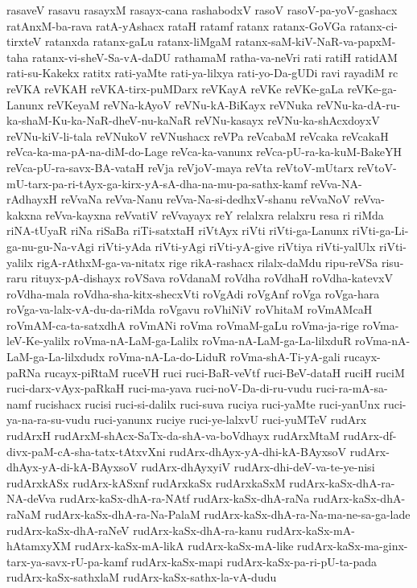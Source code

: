 {rasaveV
rasavu
rasayxM
rasayx-cana
rashabodxV
rasoV
rasoV-pa-yoV-gashacx
ratAnxM-ba-rava
ratA-yAshacx
rataH
ratamf
ratanx
ratanx-GoVGa
ratanx-ci-tirxteV
ratanxda
ratanx-gaLu
ratanx-liMgaM
ratanx-saM-kiV-NaR-va-papxM-taha
ratanx-vi-sheV-Sa-vA-daDU
rathamaM
ratha-va-neVri
rati
ratiH
ratidAM
rati-su-Kakekx
ratitx
rati-yaMte
rati-ya-lilxya
rati-yo-Da-gUDi
ravi
rayadiM
rc
reVKA
reVKAH
reVKA-tirx-puMDarx
reVKayA
reVKe
reVKe-gaLa
reVKe-ga-Lanunx
reVKeyaM
reVNa-kAyoV
reVNu-kA-BiKayx
reVNuka
reVNu-ka-dA-ru-ka-shaM-Ku-ka-NaR-dheV-nu-kaNaR
reVNu-kasayx
reVNu-ka-shAcxdoyxV
reVNu-kiV-li-tala
reVNukoV
reVNushacx
reVPa
reVcabaM
reVcaka
reVcakaH
reVca-ka-ma-pA-na-diM-do-Lage
reVca-ka-vanunx
reVca-pU-ra-ka-kuM-BakeYH
reVca-pU-ra-savx-BA-vataH
reVja
reVjoV-maya
reVta
reVtoV-mUtarx
reVtoV-mU-tarx-pa-ri-tAyx-ga-kirx-yA-sA-dha-na-mu-pa-sathx-kamf
reVva-NA-rAdhayxH
reVvaNa
reVva-Nanu
reVva-Na-si-dedhxV-shanu
reVvaNoV
reVva-kakxna
reVva-kayxna
reVvatiV
reVvayayx
reY
relalxra
relalxru
resa
ri
riMda
riNA-tUyaR
riNa
riSaBa
riTi-satxtaH
riVtAyx
riVti
riVti-ga-Lanunx
riVti-ga-Li-ga-nu-gu-Na-vAgi
riVti-yAda
riVti-yAgi
riVti-yA-give
riVtiya
riVti-yalUlx
riVti-yalilx
rigA-rAthxM-ga-va-nitatx
rige
rikA-rashacx
rilalx-daMdu
ripu-reVSa
risu-raru
rituyx-pA-dishayx
roVSava
roVdanaM
roVdha
roVdhaH
roVdha-katevxV
roVdha-mala
roVdha-sha-kitx-shecxVti
roVgAdi
roVgAnf
roVga
roVga-hara
roVga-va-lalx-vA-du-da-riMda
roVgavu
roVhiNiV
roVhitaM
roVmAMcaH
roVmAM-ca-ta-satxdhA
roVmANi
roVma
roVmaM-gaLu
roVma-ja-rige
roVma-leV-Ke-yalilx
roVma-nA-LaM-ga-Lalilx
roVma-nA-LaM-ga-La-lilxduR
roVma-nA-LaM-ga-La-lilxdudx
roVma-nA-La-do-LiduR
roVma-shA-Ti-yA-gali
rucayx-paRNa
rucayx-piRtaM
ruceVH
ruci
ruci-BaR-veVtf
ruci-BeV-dataH
ruciH
ruciM
ruci-darx-vAyx-paRkaH
ruci-ma-yava
ruci-noV-Da-di-ru-vudu
ruci-ra-mA-sa-namf
rucishacx
rucisi
ruci-si-dalilx
ruci-suva
ruciya
ruci-yaMte
ruci-yanUnx
ruci-ya-na-ra-su-vudu
ruci-yanunx
ruciye
ruci-ye-lalxvU
ruci-yuMTeV
rudArx
rudArxH
rudArxM-shAcx-SaTx-da-shA-va-boVdhayx
rudArxMtaM
rudArx-df-divx-paM-cA-sha-tatx-tAtxvXni
rudArx-dhAyx-yA-dhi-kA-BAyxsoV
rudArx-dhAyx-yA-di-kA-BAyxsoV
rudArx-dhAyxyiV
rudArx-dhi-deV-va-te-ye-nisi
rudArxkASx
rudArx-kASxnf
rudArxkaSx
rudArxkaSxM
rudArx-kaSx-dhA-ra-NA-deVva
rudArx-kaSx-dhA-ra-NAtf
rudArx-kaSx-dhA-raNa
rudArx-kaSx-dhA-raNaM
rudArx-kaSx-dhA-ra-Na-PalaM
rudArx-kaSx-dhA-ra-Na-ma-ne-sa-ga-lade
rudArx-kaSx-dhA-raNeV
rudArx-kaSx-dhA-ra-kanu
rudArx-kaSx-mA-hAtamxyXM
rudArx-kaSx-mA-likA
rudArx-kaSx-mA-like
rudArx-kaSx-ma-ginx-tarx-ya-savx-rU-pa-kamf
rudArx-kaSx-mapi
rudArx-kaSx-pa-ri-pU-ta-pada
rudArx-kaSx-sathxlaM
rudArx-kaSx-sathx-la-vA-dudu
}
